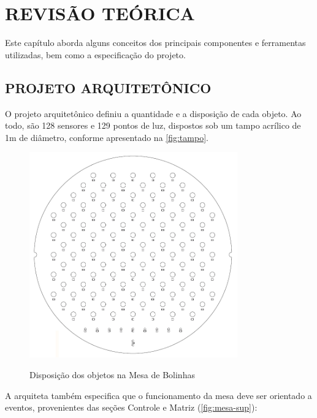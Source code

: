 
\chapter{REVISÃO TEÓRICA}
\label{chap:fundamentacaoTeorica}

Este capítulo aborda alguns conceitos dos principais componentes e ferramentas utilizadas, bem como a especificação do projeto.

\section{PROJETO ARQUITETÔNICO}
\label{sec:matrizLed}

O projeto arquitetônico definiu a quantidade e a disposição de cada objeto. Ao todo, são 128 sensores e 129 pontos de luz, dispostos sob um tampo acrílico de 1m de diâmetro, conforme apresentado na \autoref{fig:tampo}.

\begin{figure}[H]
    \centering
    \caption{Disposição dos objetos na Mesa de Bolinhas}
    \includegraphics[width=0.8\textwidth]{./dados/figuras/tampo}
    \label{fig:tampo}
\end{figure}

A arquiteta também especifica que o funcionamento da mesa deve ser orientado a eventos, provenientes das seções Controle e Matriz (\autoref{fig:mesa-sup}):


